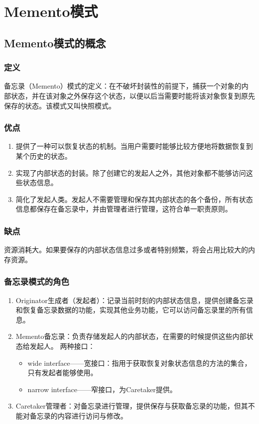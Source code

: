 \chapter{Memento模式}
\section{Memento模式的概念}
\subsection{定义}
备忘录（Memento）模式的定义：在不破坏封装性的前提下，捕获一个对象的内部状态，并在该对象之外保存这个状态，以便以后当需要时能将该对象恢复到原先保存的状态。该模式又叫快照模式。
\subsection{优点}
\begin{enumerate}
	\item 提供了一种可以恢复状态的机制。当用户需要时能够比较方便地将数据恢复到某个历史的状态。
	\item 实现了内部状态的封装。除了创建它的发起人之外，其他对象都不能够访问这些状态信息。
	\item 简化了发起人类。发起人不需要管理和保存其内部状态的各个备份，所有状态信息都保存在备忘录中，并由管理者进行管理，这符合单一职责原则。
\end{enumerate}
\subsection{缺点}
资源消耗大。如果要保存的内部状态信息过多或者特别频繁，将会占用比较大的内存资源。
\subsection{备忘录模式的角色}
\begin{enumerate}
	\item Originator生成者（发起者）：记录当前时刻的内部状态信息，提供创建备忘录和恢复备忘录数据的功能，实现其他业务功能，它可以访问备忘录里的所有信息。
	\item Memento备忘录：负责存储发起人的内部状态，在需要的时候提供这些内部状态给发起人。
	两种接口：
	\begin{itemize}
		\item wide interface——宽接口：指用于获取恢复对象状态信息的方法的集合，
		只有发起者能够使用。
		\item narrow interface——窄接口，为Caretaker提供。
	\end{itemize}
	\item Caretaker管理者：对备忘录进行管理，提供保存与获取备忘录的功能，但其不能对备忘录的内容进行访问与修改。
\end{enumerate}
